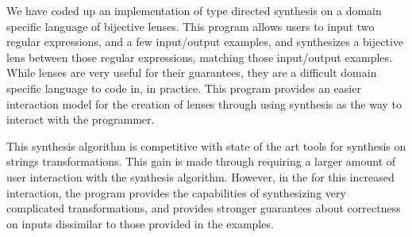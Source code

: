 \documentclass[numbers]{sigplanconf}
\begin{document}
We have coded up an implementation of type directed synthesis on a domain
specific language of bijective lenses.  This program allows users to input two
regular expressions, and a few input/output examples, and synthesizes a
bijective lens between those regular expressions, matching those input/output
examples.  While lenses are very useful for their guarantees, they are a
difficult domain specific language to code in, in practice.  This program
provides an easier interaction model for the creation of lenses through using
synthesis as the way to interact with the programmer.

This synthesis algorithm is competitive with state of the art tools for
synthesis on strings transformations.  This gain is made through requiring a
larger amount of user interaction with the synthesis algorithm.  However, in the
for this increased interaction, the program provides the capabilities of
synthesizing very complicated transformations, and provides stronger guarantees
about correctness on inputs dissimilar to those provided in the examples.

\appendix

\ifanon\else
\acks 
\fi








\onecolumn
\end{document}
